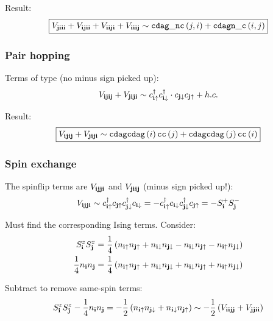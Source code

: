\documentclass[12pt,paper=a4,BCOR=16mm]{article}
\newcommand{\cUP}[1]{c_{#1\uparrow}}
\newcommand{\cdagUP}[1]{c^{\dagger}_{#1\uparrow}}
\newcommand{\cDN}[1]{c_{#1\downarrow}}
\newcommand{\cdagDN}[1]{c^{\dagger}_{#1\downarrow}}
\newcommand{\nUP}[1]{n_{#1\uparrow}}
\newcommand{\nDN}[1]{n_{#1\downarrow}}
\begin{document}
Result:
\begin{equation}
\boxed{ V_{\mathbf{jiii}} + V_{\mathbf{ijii}} + V_{\mathbf{iiji}} + V_{\mathbf{iiij}} \sim \mathtt{cdag\_nc}\left(j,i\right) + \mathtt{cdagn\_c}\left(i,j\right) }
\end{equation}

\subsubsection{Pair hopping}

Terms of type (no minus sign picked up):
\begin{equation}
V_{\v{ijij}} + V_{\v{jiji}} \sim \cdagUP{\v{i}} \cdagDN{\v{i}} \cdot \cDN{\v{j}} \cUP{\v{j}} + h.c.
\end{equation}

Result:
\begin{equation}
\boxed{ V_{\mathbf{ijij}} + V_{\mathbf{jiji}} \sim \mathtt{cdagcdag}\left(i\right)\mathtt{cc}\left(j\right) + \mathtt{cdagcdag}\left(j\right)\mathtt{cc}\left(i\right)
}
\end{equation}

\subsubsection{Spin exchange}

The spinflip terms are $V_{\mathbf{ijji}}$ and $V_{\mathbf{jiij}}$ (minus sign picked up!):
\begin{equation}
V_{\v{ijji}} \sim \cdagUP{\v{i}} \cUP{\v{j}} \cdagDN{\v{j}} \cDN{\v{i}} = -\cdagUP{\v{i}}\cDN{\v{i}} \cdagDN{\v{j}}\cUP{\v{j}} = -S^+_{\v{i}} S^-_{\v{j}}
\end{equation}

Must find the corresponding Ising terms. Consider:
\begin{equation}
\begin{split}
S^z_{\v{i}} S^z_{\v{j}} &= \frac{1}{4} \lr{ \nUP{\v{i}}\nUP{\v{j}} + \nDN{\v{i}}\nDN{\v{j}} -\nDN{\v{i}}\nUP{\v{j}} -\nUP{\v{i}}\nDN{\v{j}} }\\
\frac{1}{4} n_{\v{i}}n_{\v{j}} &= \frac{1}{4} \lr{ \nUP{\v{i}}\nUP{\v{j}} + \nDN{\v{i}}\nDN{\v{j}} +\nDN{\v{i}}\nUP{\v{j}} +\nUP{\v{i}}\nDN{\v{j}} }
\end{split}
\end{equation}

Subtract to remove same-spin terms:
\begin{equation}
S^z_{\v{i}} S^z_{\v{j}} - \frac{1}{4} n_{\v{i}}n_{\v{j}}
= -\frac{1}{2} \lr{ \nUP{\v{i}}\nDN{\v{j}} + \nDN{\v{i}}\nUP{\v{j}} }
\sim -\frac{1}{2} \lr{V_{\v{iijj}} + V_{\v{jjii}}}
\end{equation}
\end{document}

